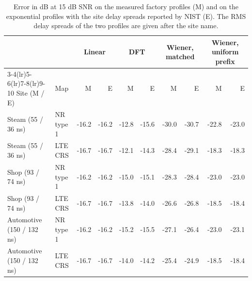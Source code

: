 \begin{table}[t]
\centering
\caption{Error in dB at 15 dB SNR on the measured factory profiles (M) and on the exponential profiles with the site delay spreads reported by NIST (E). The RMS delay spreads of the two profiles are given after the site name.}
\label{tab:measured}
\footnotesize
\setlength{\tabcolsep}{4pt}
\begin{tabular}{ll rr rr rr rr}
\toprule
 & & \multicolumn{2}{c}{Linear} & \multicolumn{2}{c}{DFT} & \multicolumn{2}{c}{Wiener, matched} & \multicolumn{2}{c}{Wiener, uniform prefix} \\
\cmidrule(lr){3-4}\cmidrule(lr){5-6}\cmidrule(lr){7-8}\cmidrule(lr){9-10}
Site (M / E) & Map & M & E & M & E & M & E & M & E \\
\midrule
Steam (55 / 36 ns) & NR type 1 & -16.2 & -16.2 & -12.8 & -15.6 & -30.0 & -30.7 & -22.8 & -23.0 \\
Steam (55 / 36 ns) & LTE CRS & -16.7 & -16.7 & -12.1 & -14.3 & -28.4 & -29.1 & -18.3 & -18.3 \\
Shop (93 / 74 ns) & NR type 1 & -16.2 & -16.2 & -15.0 & -15.1 & -28.3 & -28.4 & -23.0 & -23.0 \\
Shop (93 / 74 ns) & LTE CRS & -16.7 & -16.7 & -13.8 & -14.0 & -26.6 & -26.8 & -18.5 & -18.4 \\
Automotive (150 / 132 ns) & NR type 1 & -16.2 & -16.2 & -15.2 & -15.5 & -27.1 & -26.4 & -23.0 & -23.1 \\
Automotive (150 / 132 ns) & LTE CRS & -16.7 & -16.7 & -14.0 & -14.2 & -25.4 & -24.9 & -18.5 & -18.4 \\
\bottomrule
\end{tabular}
\end{table}
